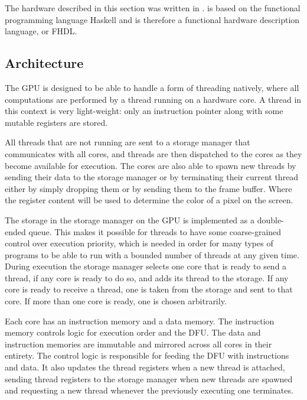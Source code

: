 		The hardware described in this section was written in \clash. \clash is
		based on the functional programming language Haskell and is therefore a
		functional hardware description language, or FHDL.

		\subsection{Architecture}

			The GPU is designed to be able to handle a form of threading
			natively, where all computations are performed by a thread running
			on a hardware core. A thread in this context is very light-weight:
			only an instruction pointer along with some mutable registers are
			stored.

			All threads that are not running are sent to a storage manager that
			communicates with all cores, and threads are then dispatched to the cores
			as they become available for execution. The cores are also able to spawn
			new threads by sending their data to the storage manager or by
			terminating their current thread either by simply dropping them or by
			sending them to the frame buffer. Where the register content will be used
			to determine the color of a pixel on the screen.

			The storage in the storage manager on the GPU is implemented
			as a double-ended queue. This makes it possible for threads to have
			some coarse-grained control over execution priority, which is
			needed in order for many types of programs to be able to run with a
			bounded number of threads at any given time. During execution the
			storage manager selects one core that is ready to send a thread, if
			any core is ready to do so, and adds its thread to the storage. If
			any core is ready to receive a thread, one is taken from the 
			storage and sent to that core. If more than one core is ready, one
			is chosen arbitrarily.

			Each core has an instruction memory and a data memory. The
			instruction memory controls logic for execution order and the DFU.
			The data and instruction memories are immutable and mirrored across
			all cores in their entirety. The control logic is responsible for
			feeding the DFU with instructions and data. It also updates the
			thread registers when a new thread is attached, sending thread
			registers to the storage manager when new threads are spawned and
			requesting a new thread whenever the previously executing one
			terminates.
			
